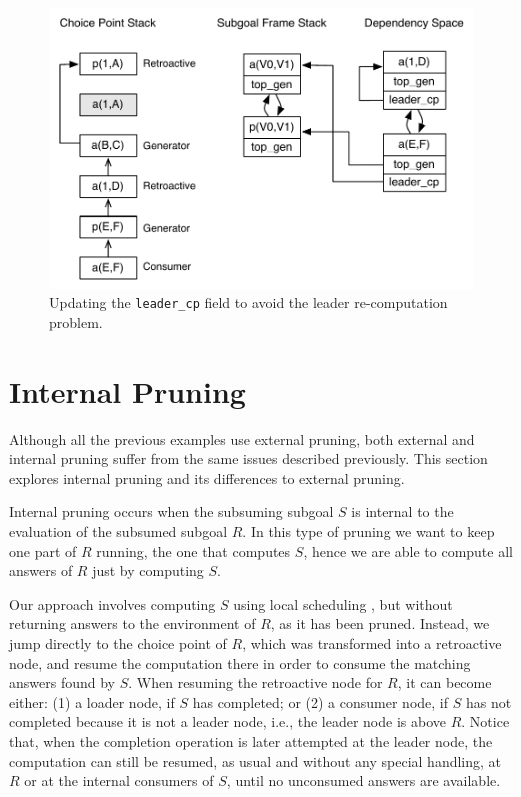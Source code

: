 \begin{figure}[ht]
  \centering
    \includegraphics[scale=0.6]{retro_leader_recomputation2.pdf}
  \caption{Updating the \texttt{leader\_cp} field to avoid the leader re-computation problem.}
  \label{fig:retro_leader_recomputation2}
\end{figure}

\section{Internal Pruning}

Although all the previous examples use external pruning, both external and internal pruning
suffer from the same issues described previously. This section explores internal pruning
and its differences to external pruning.

Internal pruning occurs when the subsuming subgoal $S$ is internal to the evaluation of the
subsumed subgoal $R$. In this type of pruning we want to keep one part of $R$ running, the one
that computes $S$, hence we are able to compute all answers of $R$ just by computing $S$.

Our approach involves computing $S$ using local scheduling \cite{Freire-96}, but without returning
answers to the environment of $R$, as it has been pruned. Instead, we jump directly to the
choice point of $R$, which was transformed into a retroactive node, and resume the computation there
in order to consume the matching answers found by $S$. When resuming the retroactive node for $R$, it
can become either: (1) a loader node, if $S$ has completed; or (2) a consumer node, if $S$ has not
completed because it is not a leader node, i.e., the leader node is above $R$.
Notice that, when the completion operation is later attempted at the leader node, the computation can
still be resumed, as usual and without any special handling, at $R$ or at the internal consumers of $S$,
until no unconsumed answers are available.

